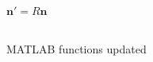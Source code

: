 \documentclass[fleqn]{article}
\begin{document}
\subsection{}
\begin{adjustwidth}{4em}{0pt}
	$\boldsymbol{n'} = R\boldsymbol{n}$
\end{adjustwidth}

\subsection{}
\begin{adjustwidth}{4em}{0pt}
	MATLAB functions updated
\end{adjustwidth}


\subsection{}
\end{document}
